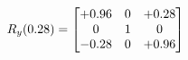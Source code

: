 \documentclass[preview]{standalone}
\begin{document}
\begin{align*}
\special{dvisvgm:raw <g id='unique000'>}R_{y}(0.28) = \begin{bmatrix}+0.96 & 0 & +0.28 \\0 & 1 & 0 \\-0.28 & 0 & +0.96\end{bmatrix}\special{dvisvgm:raw </g>}
\end{align*}
\end{document}
